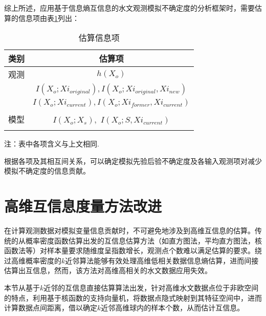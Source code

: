 综上所述，应用基于信息熵互信息的水文观测模拟不确定度的分析框架时，需要估算的信息项由表\ref{terms}列出：

\begin{table}[H] 
\centering
\caption{估算信息项}
\label{terms}
\begin{tabular}{cc}
\toprule[1.5 pt]
类别   &  估算项 \\
\midrule[1 pt]
观测   &$h(X_o)$ \\
 
 &$I(X_o;Xi_{original}),I(X_o;Xi_{original},Xi_{new})$\\
 &$I(X_o;Xi_{current}),I(X_o;Xi_{former},Xi_{current})$\\

\\
模型  & $I(X_o;X_s),$ $I(X_o;S,Xi_{current})$  \\
\bottomrule[1.5 pt]\\
\end{tabular}

\footnotesize{注：表中各项含义与上文相同.}
\end{table}

根据各项及其相互间关系，可以确定模拟先验后验不确定度及各输入观测项对减少模拟不确定度的信息贡献。










 
\section{高维互信息度量方法改进}
在计算观测数据对模拟变量信息贡献时，不可避免地涉及到高维互信息的估算。传统的从概率密度函数估算出发的互信息估算方法（如直方图法，平均直方图法，核函数法等）对样本量要求随维度呈指数增长，观测点个数难以满足估算的要求\cite{moon1995estimation}。绕过高维概率密度的$k$近邻算法能够有效处理高维低相关数据信息熵估算，进而间接估算出互信息，然而，该方法对高维高相关的水文数据应用失效\cite{phdgong}。

本节从基于$k$近邻的互信息直接估算算法\cite{kraskov2004estimating}出发，针对高维水文数据点位于非欧空间的特点，利用基于核函数的支持向量机\cite{cortes1995support}，将数据点隐式映射到其特征空间中，进而计算数据点间距离，借以确定$k$近邻高维球内的样本个数，从而估计互信息。


